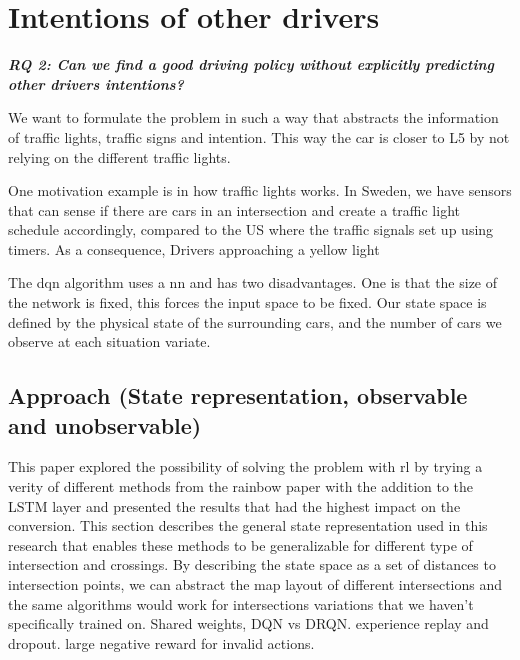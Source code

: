 \chapter{Intentions of other drivers}
\begin{center} 
\textit{\textbf{RQ 2: Can we find a good driving policy without explicitly predicting other drivers intentions?}}
\end{center}
\vspace{12pt}
We want to formulate the problem in such a way that abstracts the information of traffic lights, traffic signs and intention. This way the car is closer to L5 by not relying on the different traffic lights.

One motivation example is in how traffic lights works. In Sweden, we have sensors that can sense if there are cars in an intersection and create a traffic light schedule accordingly, compared to the US where the traffic signals set up using timers. As a consequence, Drivers approaching a yellow light 

The \gls{dqn} algorithm uses a \gls{nn} and has two disadvantages. One is that the size of the network is fixed, this forces the input space to be fixed. Our state space is defined by the physical state of the surrounding cars, and the number of cars we observe at each situation variate. %

\section{Approach (State representation, observable and unobservable)}
This paper explored the possibility of solving the problem with \gls{rl} by trying a verity of different methods from the rainbow paper with the addition to the LSTM layer and presented the results that had the highest impact on the conversion. 
This section describes the general state representation used in this research that enables these methods to be generalizable for different type of intersection and crossings. 
By describing the state space as a set of distances to intersection points, we can abstract the map layout of different intersections and the same algorithms would work for intersections variations that we haven't specifically trained on. 
Shared weights, DQN vs DRQN. 
experience replay and dropout. 
large negative reward for invalid actions.
